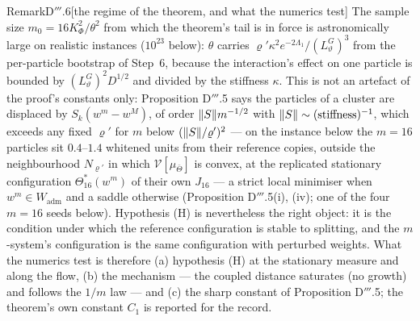 
\begin{rmk}{Remark}{D$'''$.6}[the regime of the theorem, and what the numerics test]
The sample size $m_0 = 16K_\Phi^2/\theta^2$ from which the theorem's tail is in force is astronomically large on
realistic instances ($10^{23}$ below): $\theta$ carries $\varrho'\kappa^2e^{-2\Lambda_1}/(L_\vartheta^G)^3$ from the
per-particle bootstrap of Step~6, because the interaction's effect on one particle is bounded by
$(L_\vartheta^G)^2D^{1/2}$ and divided by the stiffness $\kappa$. This is not an artefact of the proof's constants
only: Proposition D$'''$.5 says the particles of a cluster are displaced by $S_k(w^m - w^M)$, of order
$\lVert S\rVert m^{-1/2}$ with $\lVert S\rVert\sim(\text{stiffness})^{-1}$, which exceeds any fixed $\varrho'$ for $m$ below
$(\lVert S\rVert/\varrho')^2$ --- on the instance below the $m = 16$ particles sit $0.4$--$1.4$ whitened units from their
reference copies, outside the neighbourhood $N_{\varrho'}$ in which $\mathcal{V}[\mu_{\bar\Theta}]$ is convex, at the replicated stationary configuration $\Theta^*_{16}(w^m)$ of
their own $J_{16}$ --- a strict local minimiser when $w^m\in W_{\mathrm{adm}}$ and a saddle otherwise (Proposition
D$'''$.5(i), (iv); one of the four $m = 16$ seeds below). Hypothesis (H) is nevertheless the right object: it is the condition
under which the reference configuration is stable to splitting, and the $m$-system's configuration is the same
configuration with perturbed weights. What the numerics test is therefore (a) hypothesis (H) at the stationary
measure and along the flow, (b) the mechanism --- the coupled distance saturates (no growth) and follows the $1/m$
law --- and (c) the sharp constant of Proposition D$'''$.5; the theorem's own constant $C_1$ is reported for the
record.
\end{rmk}

